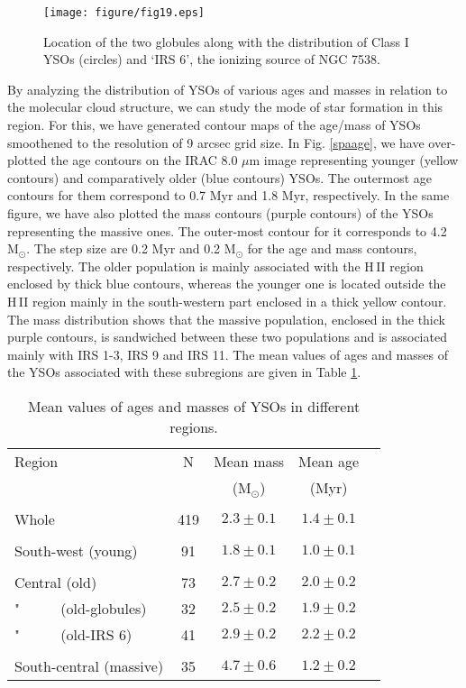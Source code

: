 \documentclass[a4paper,fleqn,usenatbib,useAMS]{mnras}
\begin{document}
\begin{figure}
\centering
\texttt{[image: figure/fig19.eps]}
\caption{\label {brc} Location of the two globules along with the distribution of Class I YSOs 
(circles) and `IRS 6', the ionizing source of NGC 7538. 
}
\end{figure}

By analyzing the distribution of YSOs of various ages and masses
in relation to the molecular cloud structure, 
we can study the mode of star formation in this region.
For this, we have  generated  contour maps of the age/mass of YSOs
smoothened to the  resolution of 9 arcsec grid size. 
In Fig. \ref{spaage}, we have over-plotted the age contours on the IRAC 8.0 $\mu$m image 
representing younger (yellow contours) and comparatively older (blue contours) YSOs.
The outermost age contours for them correspond to 0.7 Myr and 1.8 Myr, respectively.
In the same figure, we have also plotted the mass contours (purple contours) of the YSOs representing the massive ones. 
The  outer-most contour for it corresponds to 4.2 M$_\odot$. 
The step size are 0.2 Myr and 0.2 M$_\odot$ for the age and mass contours, respectively.
The older population is mainly associated with the  H\,{\sevensize II}  region enclosed by thick blue contours, 
whereas the younger one is located outside the H\,{\sevensize II}  region mainly in the south-western part enclosed
in a thick yellow contour.
The mass distribution shows that the massive population, enclosed in the thick purple contours, is sandwiched between these two populations
and is associated mainly with IRS 1-3, IRS 9 and IRS 11.
The mean values of ages and masses of the YSOs associated with these subregions are given in Table \ref{stats}.


\begin{table}
\caption{\label{stats} Mean values of ages and masses of YSOs in different regions.}
\begin{tabular}{@{}lcccc@{}}
\hline
Region & N &  Mean mass & Mean age  \\
      &   &  (M$_\odot$) & (Myr)  \\    
\hline
&&&&\\
Whole  & 419 & $2.3\pm0.1$ & $1.4\pm0.1$ \\
&&&&\\
South-west (young)   &91 &$1.8\pm 0.1$&$ 1.0\pm 0.1$\\
&&&&\\
Central (old)     &73 &$2.7\pm 0.2$&$ 2.0\pm 0.2$\\
"~~~~~  (old-globules) &32 &$2.5\pm 0.2$&$ 1.9\pm 0.2$\\
"~~~~~  (old-IRS 6)  &41 &$2.9\pm 0.2$&$ 2.2\pm 0.2$\\
&&&&\\
South-central (massive) &35 &$4.7\pm 0.6$&$ 1.2\pm 0.2$\\
\hline
\end{tabular}
\end{table}
\end{document}
